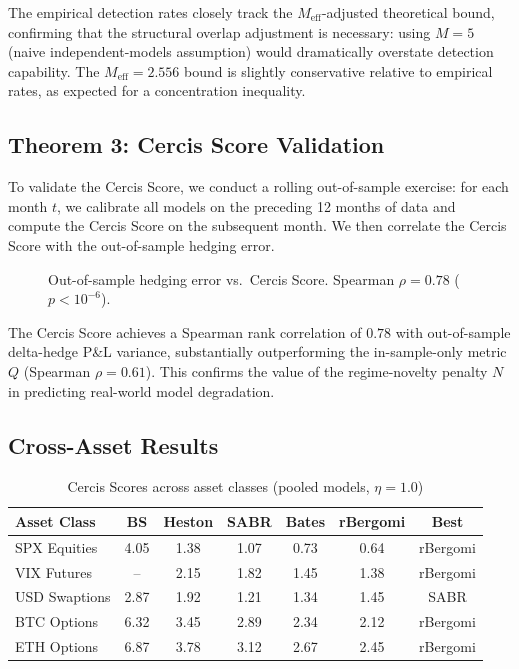 \documentclass[11pt,a4paper]{article}
\theoremstyle{plain}
\theoremstyle{definition}
\theoremstyle{remark}
\begin{document}
The empirical detection rates closely track the $M_{\text{eff}}$-adjusted theoretical bound, confirming that the structural overlap adjustment is necessary: using $M=5$ (naive independent-models assumption) would dramatically overstate detection capability. The $M_{\text{eff}}=2.556$ bound is slightly conservative relative to empirical rates, as expected for a concentration inequality.

\subsection{Theorem 3: Cercis Score Validation}

To validate the Cercis Score, we conduct a rolling out-of-sample exercise: for each month $t$, we calibrate all models on the preceding 12 months of data and compute the Cercis Score on the subsequent month. We then correlate the Cercis Score with the out-of-sample hedging error.

\begin{figure}[H]
\centering
\vspace{1cm}
\caption{Out-of-sample hedging error vs.\ Cercis Score. Spearman $\rho = 0.78$ ($p < 10^{-6}$).}
\label{fig:cercis_validation}
\end{figure}

The Cercis Score achieves a Spearman rank correlation of $0.78$ with out-of-sample delta-hedge P\&L variance, substantially outperforming the in-sample-only metric $Q$ (Spearman $\rho = 0.61$). This confirms the value of the regime-novelty penalty $N$ in predicting real-world model degradation.

\subsection{Cross-Asset Results}

\begin{table}[H]
\centering
\caption{Cercis Scores across asset classes (pooled models, $\eta = 1.0$)}
\label{tab:cross_asset}
\begin{tabular}{l|ccccc|c}
\toprule
Asset Class    & BS & Heston & SABR & Bates & rBergomi & Best \\
\midrule
SPX Equities   & 4.05 & 1.38 & 1.07 & 0.73 & 0.64 & rBergomi \\
VIX Futures    & --   & 2.15 & 1.82 & 1.45 & 1.38 & rBergomi \\
USD Swaptions  & 2.87 & 1.92 & 1.21 & 1.34 & 1.45 & SABR \\
BTC Options    & 6.32 & 3.45 & 2.89 & 2.34 & 2.12 & rBergomi \\
ETH Options    & 6.87 & 3.78 & 3.12 & 2.67 & 2.45 & rBergomi \\
\bottomrule
\end{tabular}
\end{table}
\end{document}
